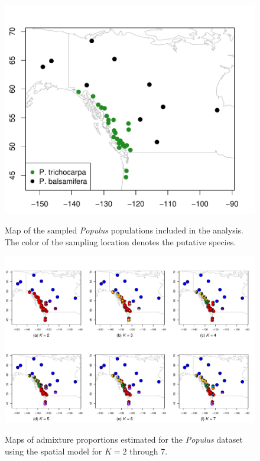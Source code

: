 \documentclass[10pt,letterpaper]{article}
\begin{document}
\begin{figure}
	\centering
		{\includegraphics[width=\textwidth]{figs/populus/populus_sampling_map.pdf}}
	\caption{
	Map of the sampled \textit{Populus} populations included in the analysis.
	The color of the sampling location denotes the putative species.
    }\label{populus_map}
\end{figure}
\clearpage

\begin{figure}
	\centering
		{\includegraphics[width=\textwidth]{figs/populus/populus_sp_pies.pdf}}
	\caption{
	Maps of admixture proportions estimated for the \textit{Populus} dataset 
	using the spatial model for $K=2$ through 7.
    }\label{populus_sp_pies}
\end{figure}
\clearpage
\end{document}
